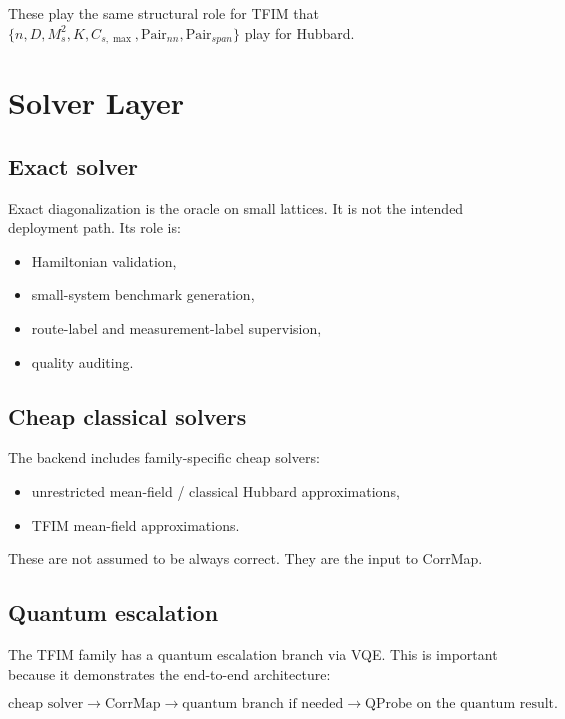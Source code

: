 \documentclass[11pt]{article}
\begin{document}
These play the same structural role for TFIM that \(\{n,D,M_s^2,K,C_{s,\max},\mathrm{Pair}_{nn},\mathrm{Pair}_{span}\}\) play for Hubbard.

\section{Solver Layer}

\subsection{Exact solver}

Exact diagonalization is the oracle on small lattices. It is not the intended deployment path. Its role is:

\begin{itemize}
\item Hamiltonian validation,
\item small-system benchmark generation,
\item route-label and measurement-label supervision,
\item quality auditing.
\end{itemize}

\subsection{Cheap classical solvers}

The backend includes family-specific cheap solvers:

\begin{itemize}
\item unrestricted mean-field / classical Hubbard approximations,
\item TFIM mean-field approximations.
\end{itemize}

These are not assumed to be always correct. They are the input to CorrMap.

\subsection{Quantum escalation}

The TFIM family has a quantum escalation branch via VQE. This is important because it demonstrates the end-to-end architecture:

\[
\text{cheap solver}
\rightarrow
\text{CorrMap}
\rightarrow
\text{quantum branch if needed}
\rightarrow
\text{QProbe on the quantum result}.
\]
\end{document}
